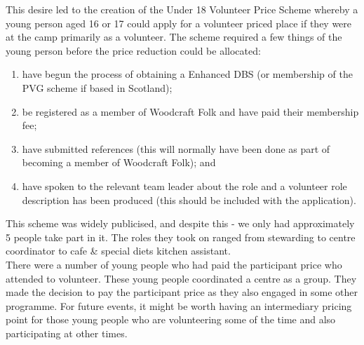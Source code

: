This desire led to the creation of the Under 18 Volunteer Price Scheme whereby a young person aged 16 or 17 could apply for a volunteer priced place if they were at the camp primarily as a volunteer. The scheme required a few things of the young person before the price reduction could be allocated: 
\begin{enumerate}
    \item have begun the process of obtaining a Enhanced DBS (or membership of the PVG scheme if based in Scotland);
    \item be registered as a member of Woodcraft Folk and have paid their membership fee;
    \item have submitted references (this will normally have been done as part of becoming a member of Woodcraft Folk); and 
    \item have spoken to the relevant team leader about the role and a volunteer role description has been produced (this should be included with the application).
\end{enumerate}
This scheme was widely publicised, and despite this - we only had approximately 5 people take part in it. The roles they took on ranged from stewarding to centre coordinator to cafe \& special diets kitchen assistant.\\

There were a number of young people who had paid the participant price who attended to volunteer. These young people coordinated a centre as a group. They made the decision to pay the participant price as they also engaged in some other programme. For future events, it might be worth having an intermediary pricing point for those young people who are volunteering some of the time and also participating at other times. 
